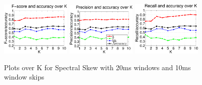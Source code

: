 	
\begin{figure}


	\centering\includegraphics[width=0.3\textwidth]{tex/appendices/test/sskew2010FP.png}
	\centering\includegraphics[width=0.3\textwidth]{tex/appendices/test/sskew2010_P.png}
	\centering\includegraphics[width=0.3\textwidth]{tex/appendices/test/sskew2010_R.png}
	
	\caption{Plots over K for Spectral Skew with 20ms windows and 10ms window skips}
\end{figure}


